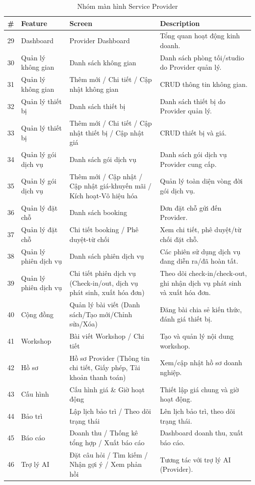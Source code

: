 \begin{table}[H]
	\centering
	\begin{tabular}{|c|p{3cm}|p{4cm}|p{6cm}|}
		\hline
		\textbf{\#} & \textbf{Feature} & \textbf{Screen} & \textbf{Description} \\
		\hline
		29 & Dashboard & Provider Dashboard &
		Tổng quan hoạt động kinh doanh. \\
		\hline
		30 & Quản lý không gian & Danh sách không gian &
		Danh sách phòng tối/studio do Provider quản lý. \\
		\hline
		31 & Quản lý không gian & Thêm mới / Chi tiết / Cập nhật không gian &
		CRUD thông tin không gian. \\
		\hline
		32 & Quản lý thiết bị & Danh sách thiết bị &
		Danh sách thiết bị do Provider quản lý. \\
		\hline
		33 & Quản lý thiết bị & Thêm mới / Chi tiết / Cập nhật thiết bị / Cập nhật giá &
		CRUD thiết bị và giá. \\
		\hline
		34 & Quản lý gói dịch vụ & Danh sách gói dịch vụ &
		Danh sách gói dịch vụ Provider cung cấp. \\
		\hline
		35 & Quản lý gói dịch vụ & Thêm mới / Cập nhật / Cập nhật giá-khuyến mãi / Kích hoạt-Vô hiệu hóa &
		Quản lý toàn diện vòng đời gói dịch vụ. \\
		\hline
		36 & Quản lý đặt chỗ & Danh sách booking &
		Đơn đặt chỗ gửi đến Provider. \\
		\hline
		37 & Quản lý đặt chỗ & Chi tiết booking / Phê duyệt-từ chối &
		Xem chi tiết, phê duyệt/từ chối đặt chỗ. \\
		\hline
		38 & Quản lý phiên dịch vụ & Danh sách phiên dịch vụ &
		Các phiên sử dụng dịch vụ đang diễn ra/đã hoàn tất. \\
		\hline
		39 & Quản lý phiên dịch vụ & Chi tiết phiên dịch vụ (Check-in/out, dịch vụ phát sinh, xuất hóa đơn) &
		Theo dõi check-in/check-out, ghi nhận dịch vụ phát sinh và xuất hóa đơn. \\
		\hline
		40 & Cộng đồng & Quản lý bài viết (Danh sách/Tạo mới/Chỉnh sửa/Xóa) &
		Đăng bài chia sẻ kiến thức, đánh giá thiết bị. \\
		\hline
		41 & Workshop & Bài viết Workshop / Chi tiết &
		Tạo và quản lý nội dung workshop. \\
		\hline
		42 & Hồ sơ & Hồ sơ Provider (Thông tin chi tiết, Giấy phép, Tài khoản thanh toán) &
		Xem/cập nhật hồ sơ doanh nghiệp. \\
		\hline
		43 & Cấu hình & Cấu hình giá \& Giờ hoạt động &
		Thiết lập giá chung và giờ hoạt động. \\
		\hline
		44 & Bảo trì & Lập lịch bảo trì / Theo dõi trạng thái &
		Lên lịch bảo trì, theo dõi trạng thái. \\
		\hline
		45 & Báo cáo & Doanh thu / Thống kê tổng hợp / Xuất báo cáo &
		Dashboard doanh thu, xuất báo cáo. \\
		\hline
		46 & Trợ lý AI & Đặt câu hỏi / Tìm kiếm / Nhận gợi ý / Xem phản hồi &
		Tương tác với trợ lý AI (Provider). \\
		\hline
	\end{tabular}
	\caption{Nhóm màn hình Service Provider}
	\label{tab:provider-screen-descriptions}
\end{table}


